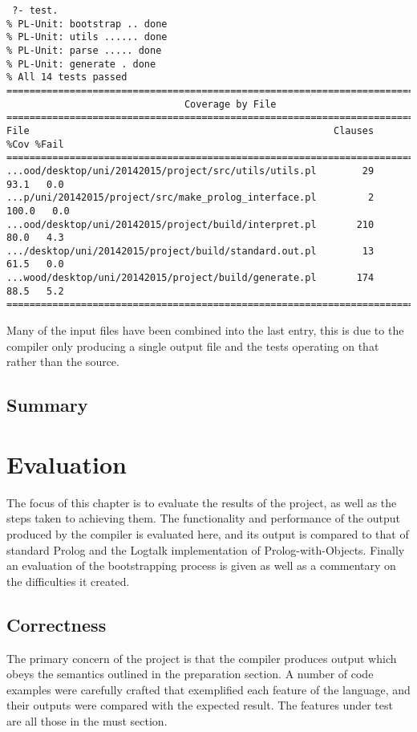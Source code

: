 \documentclass[12pt,a4paper,twoside,openright]{report}
\begin{document}
 \begin{verbatim}
 ?- test.
% PL-Unit: bootstrap .. done
% PL-Unit: utils ...... done
% PL-Unit: parse ..... done
% PL-Unit: generate . done
% All 14 tests passed
==============================================================================
                               Coverage by File                               
==============================================================================
File                                                     Clauses    %Cov %Fail
==============================================================================
...ood/desktop/uni/20142015/project/src/utils/utils.pl        29    93.1   0.0
...p/uni/20142015/project/src/make_prolog_interface.pl         2   100.0   0.0
...ood/desktop/uni/20142015/project/build/interpret.pl       210    80.0   4.3
.../desktop/uni/20142015/project/build/standard.out.pl        13    61.5   0.0
...wood/desktop/uni/20142015/project/build/generate.pl       174    88.5   5.2
==============================================================================
 \end{verbatim}

Many of the input files have been combined into the last entry, this is due to the compiler only producing a single output file and the tests operating on that rather than the source.

\section{Summary}



\chapter{Evaluation}

The focus of this chapter is to evaluate the results of the project, as well as the steps taken to achieving them. The functionality and performance of the output produced by the compiler is evaluated here, and its output is compared to that of standard Prolog and the Logtalk implementation of Prolog-with-Objects. Finally an evaluation of the bootstrapping process is given as well as a commentary on the difficulties it created.

\section{Correctness}

The primary concern of the project is that the compiler produces output which obeys the semantics outlined in the preparation section. A number of code examples were carefully crafted that exemplified each feature of the language, and their outputs were compared with the expected result. The features under test are all those in the must section.
\end{document}
